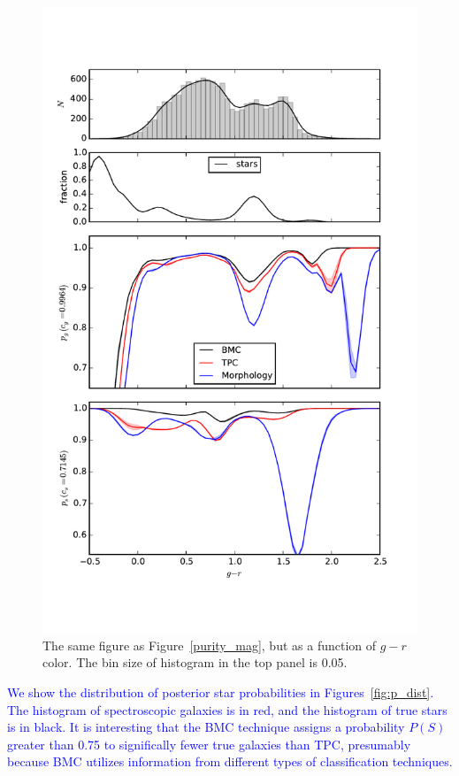 \documentclass[useAMS,usenatbib]{mn2e}
\begin{document}
\begin{figure}
  \centering
  \includegraphics[width=\linewidth]{figures/purity_g-r.pdf}
  \caption{The same figure as Figure~\ref{purity_mag},
           but as a function of $g-r$ color.
           The bin size of histogram in the top panel is 0.05.}
  \label{fig:purity_g-r}
\end{figure}


\textcolor{blue}{We show the distribution of posterior star probabilities
in Figures~\ref{fig:p_dist}.
The histogram of spectroscopic galaxies is in red,
and the histogram of true stars is in black.
It is interesting that the BMC technique assigns
a probability $P\left(S\right)$ greater than 0.75
to significally fewer true galaxies than TPC,
presumably because BMC utilizes information from
different types of classification techniques.}
\end{document}

